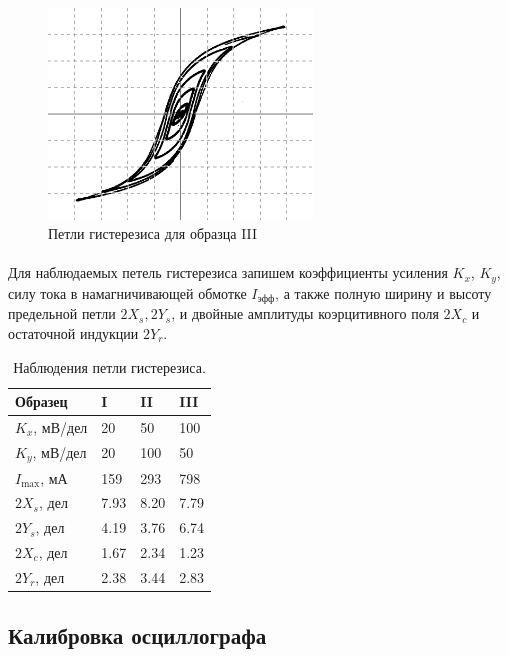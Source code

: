 \documentclass[a4paper,12pt]{article} %
\begin{document}
\begin{figure}
\begin{center}
\includegraphics[width=7cm]{Hist 3.png}
\caption{Петли гистерезиса для образца III}
\label{hist3}
\end{center}
\end{figure}

\paragraph{} Для наблюдаемых петель гистерезиса запишем коэффициенты усиления $K_x$, $K_y$, силу тока в намагничивающей обмотке $I_\text{эфф}$, а также полную ширину и высоту предельной петли $2X_s, 2Y_s$, и двойные амплитуды коэрцитивного поля $2X_c$ и остаточной индукции $2Y_r$.

\begin{table}[h]
\begin{center}
\begin{tabularx}{0.8\textwidth}{|l|X|X|X|}
\hline
Образец & I & II & III \\
\hline
$K_x$, мВ/дел & 20 & 50 & 100 \\ \hline
$K_y$, мВ/дел & 20 & 100 & 50 \\ \hline
$I_{\max}$, мА & 159 & 293 & 798 \\ \hline
$2X_s$, дел & 7.93 & 8.20 & 7.79 \\ \hline
$2Y_s$, дел & 4.19 & 3.76 & 6.74 \\ \hline
$2X_c$, дел & 1.67 & 2.34 & 1.23 \\ \hline
$2Y_r$, дел & 2.38 & 3.44 & 2.83 \\ \hline
\end{tabularx}
\caption{Наблюдения петли гистерезиса.}
\label{histtable}
\end{center}
\end{table}


\subsection{Калибровка осциллографа}
\end{document}
